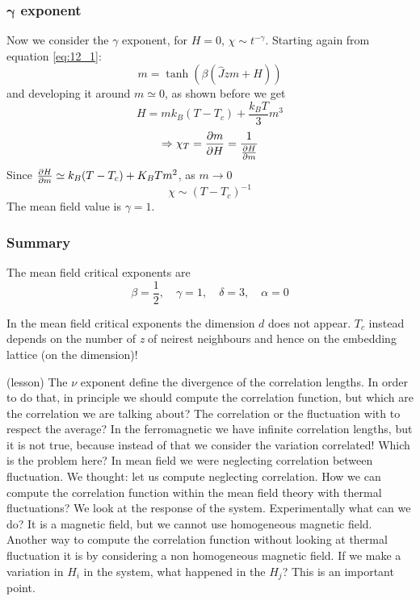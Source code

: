 \documentclass[../main/main.tex]{subfiles}
\begin{document}
\subsubsection{\( \pmb{\gamma}   \) exponent}
Now we consider the \( \gamma   \) exponent, for \( H=0 \), \( \chi \sim t^{-\gamma  } \).   Starting again from equation \eqref{eq:12_1}:
\begin{equation*}
  m = \tanh (\beta (\hat{J}zm+H ))
\end{equation*}
and developing it around \( m \simeq 0 \), as shown before we get
\begin{equation*}
  H = m k_B (T-T_c)+ \frac{k_B T}{3}m^3
\end{equation*}
\begin{equation*}
  \Rightarrow \chi _T = \pdv{m}{H} = \frac{1}{\pdv{H}{m} }
\end{equation*}
Since \( \pdv{H}{m} \simeq k_B (T-T_c) + K_B T m^2 \), as \( m \rightarrow 0 \)
\begin{equation}
  \chi \sim (T-T_c)^{-1}
\end{equation}
The mean field value is \( \gamma =1  \).

\subsubsection{Summary}
The mean field critical exponents are
\begin{equation}
  \beta = \frac{1}{2}, \quad \gamma =1, \quad \delta =3, \quad \alpha =0
\end{equation}
\begin{remark}
In the mean field critical exponents the dimension \( d \) does not appear. \( T_c \) instead depends on the number of \emph{z} of neirest neighbours and hence on the embedding lattice (on the dimension)!
\end{remark}
\begin{remark}
  (lesson)
  The \( \nu  \) exponent define the divergence of the correlation lengths. In order to do that, in principle we should compute the correlation function, but which are the correlation we are talking about? The correlation or the fluctuation with to respect the average? In the ferromagnetic we have infinite correlation lengths, but it is not true, because instead of that we consider the variation correlated!
  Which is the problem here? In mean field we were neglecting correlation between fluctuation.
  We thought: let us compute neglecting correlation.
  How we can compute the correlation function within the mean field theory with thermal fluctuations? We look at the response of the system. Experimentally what can we do? It is a magnetic field, but we cannot use homogeneous magnetic field. Another way to compute the correlation function without looking at thermal fluctuation it is by considering a non homogeneous magnetic field.
  If we make a variation in \( H_i \) in the system, what happened in the \( H_j \)? This is an important point.
\end{remark}
\end{document}
